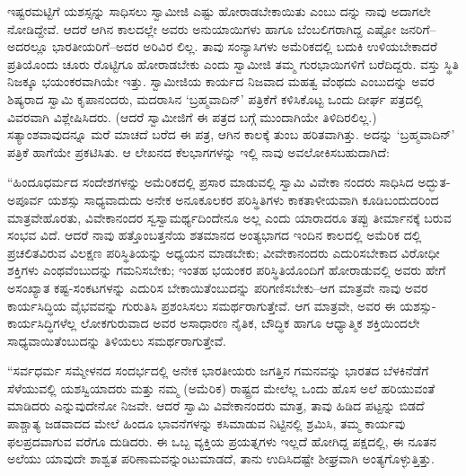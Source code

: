 ಇಷ್ಟರಮಟ್ಟಿಗೆ ಯಶಸ್ಸನ್ನು ಸಾಧಿಸಲು ಸ್ವಾಮೀಜಿ ಎಷ್ಟು ಹೋರಾಡಬೇಕಾಯಿತು ಎಂಬು ದನ್ನು ನಾವು ಅದಾಗಲೇ ನೋಡಿದ್ದೇವೆ. ಆದರೆ ಆಗಿನ ಕಾಲದಲ್ಲೇ ಅವರು ಅನುಯಾಯಿಗಳು ಹಾಗೂ ಬೆಂಬಲಿಗರಾಗಿದ್ದ ಎಷ್ಟೋ ಜನರಿಗೆ–ಅದರಲ್ಲೂ ಭಾರತೀಯರಿಗೆ–ಅದರ ಅರಿವಿರ ಲಿಲ್ಲ. ತಾವು ಸಂನ್ಯಾಸಿಗಳು ಅಮೆರಿಕದಲ್ಲಿ ಬದುಕಿ ಉಳಿಯಬೇಕಾದರೆ ಪ್ರತಿಯೊಂದು ಚೂರು ರೊಟ್ಟಿಗೂ ಹೋರಾಡಬೇಕು ಎಂದು ಸ್ವಾಮೀಜಿ ತಮ್ಮ ಗುರಭಾಯಿಗಳಿಗೆ ಬರೆದಿದ್ದರು. ವಸ್ತು ಸ್ಥಿತಿ ನಿಜಕ್ಕೂ ಭಯಂಕರವಾಗಿಯೇ ಇತ್ತು. ಸ್ವಾಮೀಜಿಯ ಕಾರ್ಯದ ನಿಜವಾದ ಮಹತ್ವ ವೆಂಥದು ಎಂಬುದನ್ನು ಅವರ ಶಿಷ್ಯರಾದ ಸ್ವಾಮಿ ಕೃಪಾನಂದರು, ಮದರಾಸಿನ ‘ಬ್ರಹ್ಮವಾದಿನ್​’ ಪತ್ರಿಕೆಗೆ ಕಳಿಸಿಕೊಟ್ಟ ಒಂದು ದೀರ್ಘ ಪತ್ರದಲ್ಲಿ ವಿವರವಾಗಿ ವಿಶ್ಲೇಷಿಸಿದರು. (ಆದರೆ ಸ್ವಾಮೀಜಿಗೆ ಈ ಪತ್ರದ ಬಗ್ಗೆ ಮುಂದಾಗಿಯೇ ತಿಳಿದಿರಲಿಲ್ಲ.) ಸತ್ಯಾಂಶವಾವುದನ್ನೂ ಮರೆ ಮಾಚದೆ ಬರೆದ ಈ ಪತ್ರ, ಆಗಿನ ಕಾಲಕ್ಕೆ ತುಂಬ ಹರಿತವಾಗಿತ್ತು. ಅದನ್ನು ‘ಬ್ರಹ್ಮವಾದಿನ್​’ ಪತ್ರಿಕೆ ಹಾಗೆಯೇ ಪ್ರಕಟಿಸಿತು. ಆ ಲೇಖನದ ಕೆಲಭಾಗಗಳನ್ನು ಇಲ್ಲಿ ನಾವು ಅವಲೋಕಿಸಬಹುದಾಗಿದೆ:

“ಹಿಂದೂಧರ್ಮದ ಸಂದೇಶಗಳನ್ನು ಅಮೆರಿಕದಲ್ಲಿ ಪ್ರಸಾರ ಮಾಡುವಲ್ಲಿ ಸ್ವಾಮಿ ವಿವೇಕಾ ನಂದರು ಸಾಧಿಸಿದ ಅದ್ಭುತ-ಅಪೂರ್ವ ಯಶಸ್ಸು ಸಾಧ್ಯವಾದುದು ಅನೇಕ ಅನೂಕೂಲಕರ ಪರಿಸ್ಥಿತಿಗಳು ಕಾಕತಾಳೀಯವಾಗಿ ಕೂಡಿಬಂದುದರಿಂದ ಮಾತ್ರವೇಹೊರತು, ವಿವೇಕಾನಂದರ ಸ್ವಸ್ವಾಮರ್ಥ್ಯದಿಂದೇನೂ ಅಲ್ಲ ಎಂದು ಯಾರಾದರೂ ತಪ್ಪು ತೀರ್ಮಾನಕ್ಕೆ ಬರುವ ಸಂಭವ ವಿದೆ. ಆದರೆ ನಾವು ಹತ್ತೊಂಬತ್ತನೆಯ ಶತಮಾನದ ಅಂತ್ಯಭಾಗದ ಇಂದಿನ ಕಾಲದಲ್ಲಿ ಅಮೆರಿಕ ದಲ್ಲಿ ಪ್ರಚಲಿತವಿರುವ ವಿಲಕ್ಷಣ ಪರಿಸ್ಥಿತಿಯನ್ನು ಅಧ್ಯಯನ ಮಾಡಬೇಕು; ವೀವೇಕಾನಂದರು ಎದುರಿಸಬೇಕಾದ ವಿರೋಧೀ ಶಕ್ತಿಗಳು ಎಂಥವೆಂಬುದನ್ನು ಗಮನಿಸಬೇಕು; ಇಂತಹ ಭಯಂಕರ ಪರಿಸ್ಥಿತಿಯೊಂದಿಗೆ ಹೋರಾಡುವಲ್ಲಿ ಅವರು ಹೇಗೆ ಅಸಂಖ್ಯಾತ ಕಷ್ಟ-ಸಂಕಟಗಳನ್ನು ಎದುರಿಸ ಬೇಕಾಯಿತೆಂಬುದನ್ನು ಪರಿಗಣಿಸಬೇಕು–ಆಗ ಮಾತ್ರವೇ ನಾವು ಅವರ ಕಾರ್ಯಸಿದ್ಧಿಯ ವೈಭವವನ್ನು ಗುರುತಿಸಿ ಪ್ರಶಂಸಿಸಲು ಸಮರ್ಥರಾಗುತ್ತೇವೆ. ಆಗ ಮಾತ್ರವೇ, ಅವರ ಈ ಯಶಸ್ಸು-ಕಾರ್ಯಸಿದ್ಧಿಗಳೆಲ್ಲ ಲೋಕಗುರುವಾದ ಅವರ ಅಸಾಧಾರಣ ನೈತಿಕ, ಬೌದ್ಧಿಕ ಹಾಗೂ ಆಧ್ಯಾತ್ಮಿಕ ಶಕ್ತಿಯಿಂದಲೇ ಸಾಧ್ಯವಾಯಿತೆಂಬುದನ್ನು ತಿಳಿಯಲು ಸಮರ್ಥರಾಗುತ್ತೇವೆ.

“ಸರ್ವಧರ್ಮ ಸಮ್ಮೇಳನದ ಸಂದರ್ಭದಲ್ಲಿ ಅನೇಕ ಭಾರತೀಯರು ಜಗತ್ತಿನ ಗಮನವನ್ನು ಭಾರತದ ಬೆಳಕಿನೆಡೆಗೆ ಸೆಳೆಯುವಲ್ಲಿ ಯಶಸ್ವಿಯಾದರು ಮತ್ತು ನಮ್ಮ (ಅಮೆರಿಕ) ರಾಷ್ಟ್ರದ ಮೇಲೆಲ್ಲ ಒಂದು ಹೊಸ ಅಲೆ ಹರಿಯುವಂತೆ ಮಾಡಿದರು ಎನ್ನುವುದೇನೋ ನಿಜವೇ. ಆದರೆ ಸ್ವಾಮಿ ವಿವೇಕಾನಂದರು ಮಾತ್ರ, ತಾವು ಹಿಡಿದ ಪಟ್ಟನ್ನು ಬಿಡದೆ ಪಾಶ್ಚಾತ್ಯ ಜಡವಾದದ ಮೇಲೆ ಹಿಂದೂ ಭಾವನೆಗಳನ್ನು ಕಸಿಮಾಡುವ ನಿಟ್ಟಿನಲ್ಲಿ ಶ್ರಮಿಸಿ, ತಮ್ಮ ಕಾರ್ಯವು ಫಲಪ್ರದವಾಗುವ ವರೆಗೂ ದುಡಿದರು. ಈ ಒಬ್ಬ ವ್ಯಕ್ತಿಯ ಪ್ರಯತ್ನಗಳು ಇಲ್ಲದೆ ಹೋಗಿದ್ದ ಪಕ್ಷದಲ್ಲಿ, ಈ ನೂತನ ಅಲೆಯು ಯಾವುದೇ ಶಾಶ್ವತ ಪರಿಣಾಮವನ್ನುಂಟುಮಾಡದೆ, ತಾನು ಉದಿಸಿದಷ್ಟೇ ಶೀಘ್ರವಾಗಿ ಅಂತ್ಯಗೊಳ್ಳುತ್ತಿತ್ತು.

